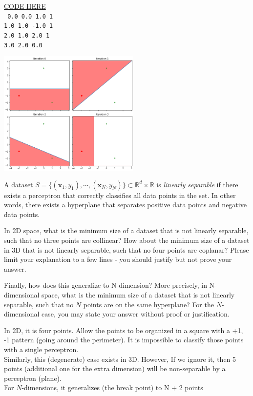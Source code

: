 \begin{solution}
\href{https://colab.research.google.com/drive/1Gq4s0ZueixyhST93Yo0EFipu_uvUbHx9?usp=sharing}{CODE HERE}
\\
\texttt{
0.0 0.0 1.0 1 \\
1.0 1.0 -1.0 1 \\
2.0 1.0 2.0 1 \\
3.0 2.0 0.0 \\
}
\begin{center}
    \includegraphics[width=7cm]{set1/images/p.png}
\end{center}

\end{solution}

\begin{problem}[4]
  A dataset $S = \{(\mathbf{x}_1, y_1),\cdots,(\mathbf{x}_N, y_N)\} \subset \mathbb{R}^d \times \mathbb{R}$ is \emph{linearly separable} if there exists a perceptron that correctly classifies all data points in the set. In other words, there exists a hyperplane that separates positive data points and negative data points.

  In 2D space, what is the minimum size of a dataset that is not linearly separable, such that no three points are collinear? How about the minimum size of a dataset in 3D that is not linearly separable, such that no four points are coplanar? Please limit your explanation to a few lines - you should justify but not prove your answer.

  Finally, how does this generalize to N-dimension? More precisely, in N-dimensional space, what is the minimum size of a dataset that is not linearly separable, such that no $N$ points are on the same hyperplane? For the $N$-dimensional case, you may state your answer without proof or justification.
\end{problem}
\begin{solution}
In 2D, it is four points. Allow the points to be organized in a square with a +1, -1 pattern (going around the perimeter). It is impossible to classify those points with a single perceptron. \\

Similarly, this (degenerate) case exists in 3D. However, If we ignore it, then 5 points (additional one for the extra dimension) will be non-separable by a perceptron (plane). \\

For $N$-dimensions, it generalizes (the break point) to N + 2 points
\end{solution}

